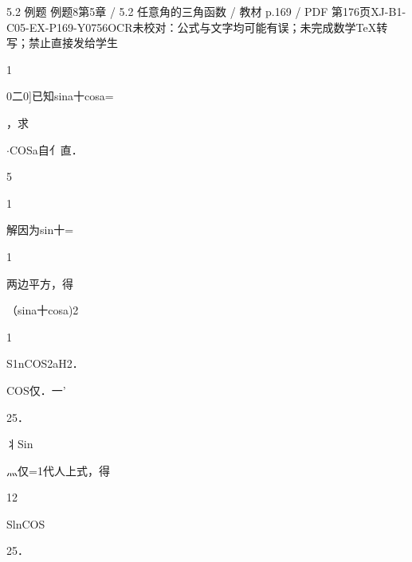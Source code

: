 \begin{bankitem}{5.2 例题 例题8}{第5章 / 5.2 任意角的三角函数 / 教材 p.169 / PDF 第176页}{XJ-B1-C05-EX-P169-Y0756}{OCR未校对：公式与文字均可能有误；未完成数学TeX转写；禁止直接发给学生}
\begin{ocrdraft}
\par
1
\par
0二0]已知sina十cosa=
\par
，求
\par
\ensuremath{\cdot}COSa自亻直．
\par
5
\par
1
\par
解因为sin十=
\par
1
\par
两边平方，得
\par
（sina十cosa)2
\par
1
\par
S1nCOS2aH2．
\par
COS仅．一'
\par
25．
\par
丬Sin
\par
灬仅=1代人上式，得
\par
12
\par
SlnCOS
\par
25．
\end{ocrdraft}
\end{bankitem}
